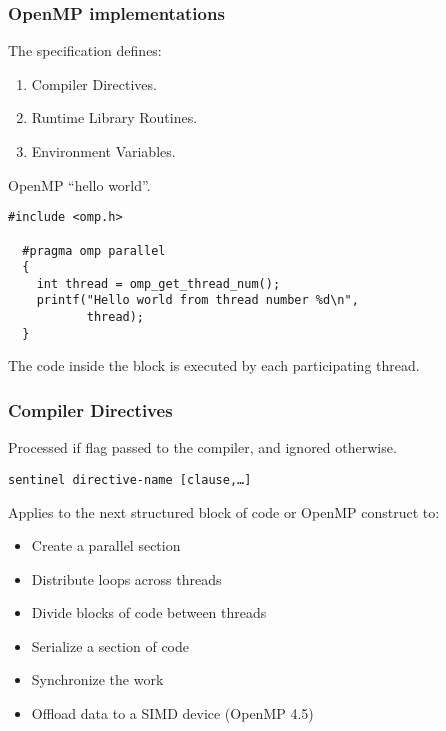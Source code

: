 \begin{frame}[fragile]
\frametitle{OpenMP implementations}

The specification defines:

\begin{enumerate}
\item Compiler Directives.
\medskip
\item Runtime Library Routines.
\medskip
\item Environment Variables.
\end{enumerate}

OpenMP ``hello world''.
\begin{lstlisting}[style=c]
  #include <omp.h>

  #pragma omp parallel
  {
    int thread = omp_get_thread_num();
    printf("Hello world from thread number %d\n",
           thread);
  }
\end{lstlisting}
The code inside the block is executed by each participating thread.

\end{frame}

\begin{frame}
\frametitle{Compiler Directives}

Processed if flag passed to the compiler, and ignored otherwise.

\begin{center}
\texttt{sentinel directive-name [clause,\dots]}
\end{center}

\medskip
Applies to the next structured block of code or OpenMP construct to:
\begin{itemize}
\item Create a parallel section
\item Distribute loops across threads
\item Divide blocks of code between threads
\item Serialize a section of code
\item Synchronize the work
\item Offload data to a SIMD device (OpenMP 4.5)
\end{itemize}

\end{frame}

